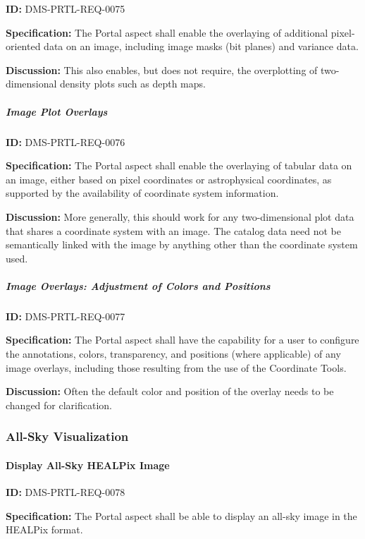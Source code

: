 \documentclass[SE,toc]{lsstdoc}
\begin{document}
\label{DMS-PRTL-REQ-0075}
\textbf{ID:} DMS-PRTL-REQ-0075

\textbf{Specification:}
The Portal aspect shall enable the overlaying of additional pixel-oriented data on an image, including image masks (bit planes) and variance data.

\textbf{Discussion:}
This also enables, but does not require, the overplotting of two-dimensional density plots such as depth maps.

\subparagraph{Image Plot Overlays}\hfill  %

\label{DMS-PRTL-REQ-0076}
\textbf{ID:} DMS-PRTL-REQ-0076

\textbf{Specification:}
The Portal aspect shall enable the overlaying of tabular data on an image, either based on pixel coordinates or astrophysical coordinates, as supported by the availability of coordinate system information.

\textbf{Discussion:}
More generally, this should work for any two-dimensional plot data that shares a coordinate system with an image.  The catalog data need not be semantically linked with the image by anything other than the coordinate system used.

\subparagraph{Image Overlays: Adjustment of Colors and Positions}\hfill  %

\label{DMS-PRTL-REQ-0077}
\textbf{ID:} DMS-PRTL-REQ-0077

\textbf{Specification:}
The Portal aspect shall have the capability for a user to configure the annotations, colors, transparency, and positions (where applicable) of any image overlays, including those resulting from the use of the Coordinate Tools.

\textbf{Discussion:}
Often the default color and position of the overlay needs to be changed for clarification.

\subsubsection{All-Sky Visualization}

\paragraph{Display All-Sky HEALPix Image}\hfill  %

\label{DMS-PRTL-REQ-0078}
\textbf{ID:} DMS-PRTL-REQ-0078

\textbf{Specification:}
The Portal aspect shall be able to display an all-sky image in the HEALPix format.
\end{document}
